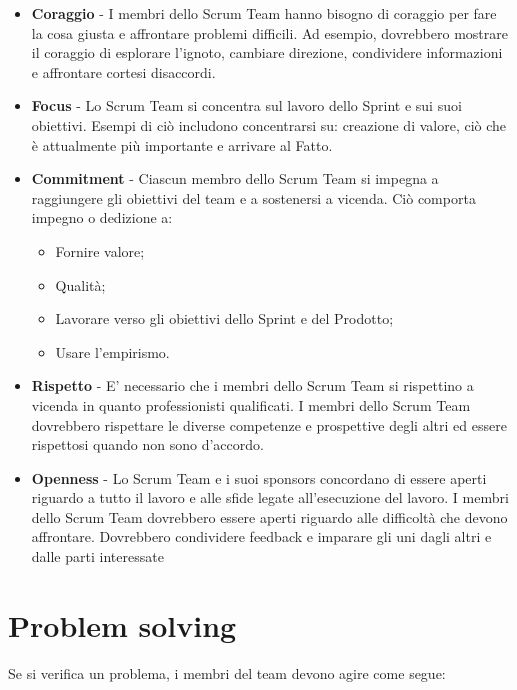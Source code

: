 \documentclass{article}
\begin{document}
\begin{itemize}
    \item \textbf{Coraggio} - I membri dello Scrum Team hanno bisogno di coraggio per fare la cosa giusta e affrontare problemi difficili. 
    Ad esempio, dovrebbero mostrare il coraggio di esplorare l'ignoto, cambiare direzione, condividere informazioni e affrontare cortesi disaccordi.
    
    \item \textbf{Focus} - Lo Scrum Team si concentra sul lavoro dello Sprint e sui suoi obiettivi. 
    Esempi di ciò includono concentrarsi su: creazione di valore, ciò che è attualmente più importante e arrivare al Fatto.
    
    \item \textbf{Commitment} - Ciascun membro dello Scrum Team si impegna a raggiungere gli obiettivi del team e a sostenersi a vicenda. 
    Ciò comporta impegno o dedizione a:
    \begin{itemize}
        \item Fornire valore;
        \item Qualità;
        \item Lavorare verso gli obiettivi dello Sprint e del Prodotto;
        \item Usare l'empirismo.
    \end{itemize}

    
    \item \textbf{Rispetto} - E' necessario che i membri dello Scrum Team si rispettino a vicenda in quanto professionisti qualificati. 
    I membri dello Scrum Team dovrebbero rispettare le diverse competenze e prospettive degli altri ed essere rispettosi quando 
    non sono d'accordo.
     
    \item \textbf{Openness} - Lo Scrum Team e i suoi sponsors concordano di essere aperti riguardo a tutto il lavoro e alle sfide legate all'esecuzione del lavoro.
    I membri dello Scrum Team dovrebbero essere aperti riguardo alle difficoltà che devono affrontare. Dovrebbero condividere feedback e imparare gli uni 
    dagli altri e dalle parti interessate
\end{itemize}

\section{Problem solving}
Se si verifica un problema, i membri del team devono agire come segue:
\end{document}
